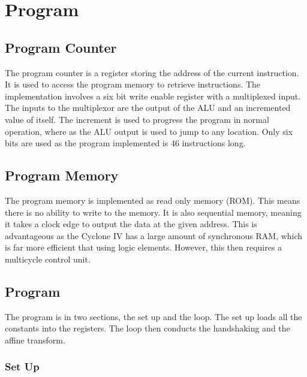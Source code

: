 
\section{Program}\label{sect:prog}

\subsection{Program Counter}
The program counter is a register storing the address of the current instruction.
It is used to access the program memory to retrieve instructions. 
The implementation involves a six bit write enable register with a multiplexed input. 
The inputs to the multiplexor are the output of the ALU and an incremented value of itself.
The increment is used to progress the program in normal operation, where as the ALU output is used to jump to any location.
Only six bits are used as the program implemented is 46 instructions long. 

\subsection{Program Memory}
The program memory is implemented as read only memory (ROM). 
This means there is no ability to write to the memory.
It is also sequential memory, meaning it takes a clock edge to output the data at the given address. 
This is advantageous as the Cyclone IV has a large amount of synchronous RAM, which is far more efficient that using logic elements.
However, this then requires a multicycle control unit. 

\subsection{Program}

The program is in two sections, the set up and the loop. 
The set up loads all the constants into the registers. 
The loop then conducts the handshaking and the affine transform. 

\subsubsection{Set Up}

